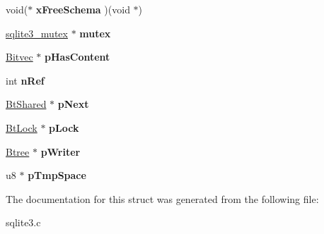 \begin{DoxyCompactItemize}
\item 
void($\ast$ {\bfseries x\+Free\+Schema} )(void $\ast$)\hypertarget{structBtShared_af8f5f15b6ff3f66a8abb34ddc14d4d7a}{}\label{structBtShared_af8f5f15b6ff3f66a8abb34ddc14d4d7a}

\item 
\hyperlink{structsqlite3__mutex}{sqlite3\+\_\+mutex} $\ast$ {\bfseries mutex}\hypertarget{structBtShared_a454c31d726220bbed43c165e370460c8}{}\label{structBtShared_a454c31d726220bbed43c165e370460c8}

\item 
\hyperlink{structBitvec}{Bitvec} $\ast$ {\bfseries p\+Has\+Content}\hypertarget{structBtShared_ace6191dc3f48f9575d7946ab8cf5b919}{}\label{structBtShared_ace6191dc3f48f9575d7946ab8cf5b919}

\item 
int {\bfseries n\+Ref}\hypertarget{structBtShared_a43d0226fa08d7fae5f992f3a2d72cc08}{}\label{structBtShared_a43d0226fa08d7fae5f992f3a2d72cc08}

\item 
\hyperlink{structBtShared}{Bt\+Shared} $\ast$ {\bfseries p\+Next}\hypertarget{structBtShared_aaa9dd5c5d4ec2bb79ebe4b37ee926ae3}{}\label{structBtShared_aaa9dd5c5d4ec2bb79ebe4b37ee926ae3}

\item 
\hyperlink{structBtLock}{Bt\+Lock} $\ast$ {\bfseries p\+Lock}\hypertarget{structBtShared_af58c79eec88f99ed5a07d8cabf8a1d1a}{}\label{structBtShared_af58c79eec88f99ed5a07d8cabf8a1d1a}

\item 
\hyperlink{structBtree}{Btree} $\ast$ {\bfseries p\+Writer}\hypertarget{structBtShared_ad8b2679e54027d58a3be3afcca4df1d6}{}\label{structBtShared_ad8b2679e54027d58a3be3afcca4df1d6}

\item 
u8 $\ast$ {\bfseries p\+Tmp\+Space}\hypertarget{structBtShared_a89102c20327da8a304f7e95af557bdf4}{}\label{structBtShared_a89102c20327da8a304f7e95af557bdf4}

\end{DoxyCompactItemize}


The documentation for this struct was generated from the following file\+:\begin{DoxyCompactItemize}
\item 
sqlite3.\+c\end{DoxyCompactItemize}

